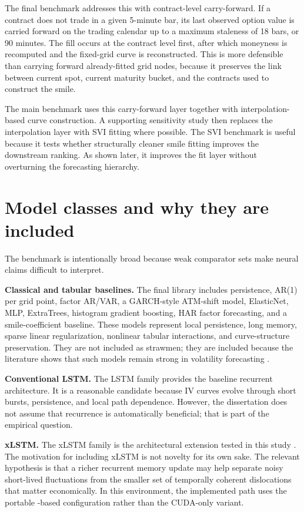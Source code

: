 \documentclass[12pt]{report}
\newcommand{\code}[1]{\begingroup\ttfamily\path{#1}\endgroup}
\begin{document}
The final benchmark addresses this with contract-level carry-forward. If a contract does not trade in a given 5-minute bar, its last observed option value is carried forward on the trading calendar up to a maximum staleness of 18 bars, or 90 minutes. The fill occurs at the contract level first, after which moneyness is recomputed and the fixed-grid curve is reconstructed. This is more defensible than carrying forward already-fitted grid nodes, because it preserves the link between current spot, current maturity bucket, and the contracts used to construct the smile.

The main benchmark uses this carry-forward layer together with interpolation-based curve construction. A supporting sensitivity study then replaces the interpolation layer with SVI fitting where possible. The SVI benchmark is useful because it tests whether structurally cleaner smile fitting improves the downstream ranking. As shown later, it improves the fit layer without overturning the forecasting hierarchy.

\section{Model classes and why they are included}
The benchmark is intentionally broad because weak comparator sets make neural claims difficult to interpret.

\textbf{Classical and tabular baselines.} The final library includes persistence, AR(1) per grid point, factor AR/VAR, a GARCH-style ATM-shift model, ElasticNet, MLP, ExtraTrees, histogram gradient boosting, HAR factor forecasting, and a smile-coefficient baseline. These models represent local persistence, long memory, sparse linear regularization, nonlinear tabular interactions, and curve-structure preservation. They are not included as strawmen; they are included because the literature shows that such models remain strong in volatility forecasting \citep{engle1982,bollerslev1986,corsi2009,chen2024bspline}.

\textbf{Conventional LSTM.} The LSTM family provides the baseline recurrent architecture. It is a reasonable candidate because IV curves evolve through short bursts, persistence, and local path dependence. However, the dissertation does not assume that recurrence is automatically beneficial; that is part of the empirical question.

\textbf{xLSTM.} The xLSTM family is the architectural extension tested in this study \citep{beck2024xlstm}. The motivation for including xLSTM is not novelty for its own sake. The relevant hypothesis is that a richer recurrent memory update may help separate noisy short-lived fluctuations from the smaller set of temporally coherent dislocations that matter economically. In this environment, the implemented path uses the portable \code{mLSTM}-based configuration rather than the CUDA-only \code{sLSTM} variant.
\end{document}

